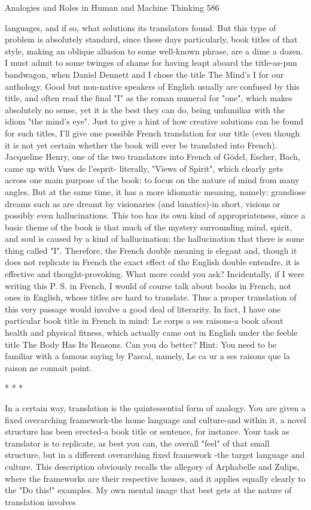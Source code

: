 Analogies and Roles in Human and Machine Thinking                                     586

languages, and if so, what solutions its translators found. But this type of problem is
absolutely standard, since these days particularly, book titles of that style, making an
oblique allusion to some well-known phrase, are a dime a dozen.
         I must admit to some twinges of shame for having leapt aboard the title-as-pun
bandwagon, when Daniel Dennett and I chose the title The Mind's I for our anthology.
Good but non-native speakers of English usually are confused by this title, and often
read the final "I" as the roman numeral for "one", which makes absolutely no sense,
yet it is the best they can do, being unfamiliar with the idiom "the mind's eye".
         Just to give a hint of how creative solutions can be found for such titles, I'll
give one possible French translation for our title (even though it is not yet certain
whether the book will ever be translated into French). Jacqueline Henry, one of the
two translators into French of Gödel, Escher, Bach, came up with Vues de l’esprit-
literally, "Views of Spirit", which clearly gets across one main purpose of the book: to
focus on the nature of mind from many angles. But at the same time, it has a more
idiomatic meaning, namely: grandiose dreams such as are dreamt by visionaries (and
lunatics)-in short, visions or possibly even hallucinations. This too has its own kind of
appropriateness, since a basic theme of the book is that much of the mystery
surrounding mind, spirit, and soul is caused by a kind of hallucination: the
hallucination that there is some thing called "I". Therefore, the French double
meaning is elegant and, though it does not replicate in French the exact effect of the
English double entendre, it is effective and thought-provoking. What more could you
ask?
         Incidentally, if I were writing this P. S. in French, I would of course talk about
books in French, not ones in English, whose titles are hard to translate. Thus a proper
translation of this very passage would involve a good deal of literarity. In fact, I have
one particular book title in French in mind: Le corps a ses raisons-a book about health
and physical fitness, which actually came out in English under the feeble title The
Body Has Its Reasons. Can you do better? Hint: You need to be familiar with a
famous saying by Pascal, namely, Le ca ur a ses raisons que la raison ne connait
point.

*   *   *

        In a certain way, translation is the quintessential form of analogy. You are
given a fixed overarching framework-the home language and culture-and within it, a
novel structure has been erected-a book title or sentence, for instance. Your task as
translator is to replicate, as best you can, the overall "feel" of that small structure, but
in a different overarching fixed framework -the target language and culture. This
description obviously recalls the allegory of Arphabelle and Zulips, where the
frameworks are their respective houses, and it applies equally clearly to the "Do this!"
examples.
        My own mental image that best gets at the nature of translation involves




